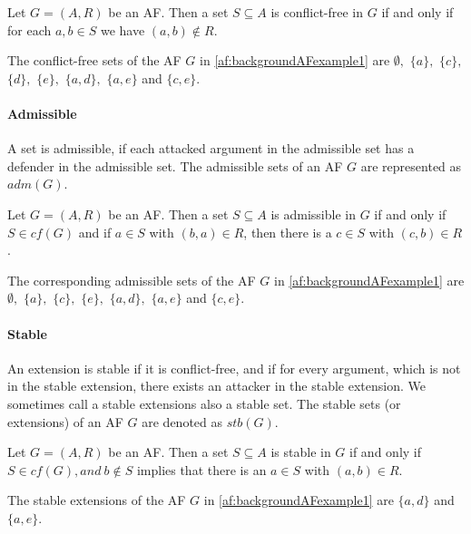 \begin{definition}
    Let $G=(A,R)$ be an AF. Then a set $S \subseteq A$ is conflict-free in $G$ if and only if for each $a, b \in S$ we have $(a, b) \not\in R$.
\end{definition}

\begin{example}
    The conflict-free sets of the AF $G$ in \cref{af:backgroundAFexample1} are $\emptyset ,$
    $\{a\},$
    $\{c\},$
    $\{d\},$
    $\{e\},$
    $\{a, d\},$
    $\{a, e\}$ and
    $\{c, e\}$.
\end{example}





\paragraph{Admissible}  A set is admissible, if each attacked argument in the admissible set has a defender in the admissible set. The admissible sets of an AF $G$ are represented as $adm(G)$.


\begin{definition}
    Let $G=(A,R)$ be an AF. Then a set $S \subseteq A$ is admissible in $G$ if and only if $S \in cf(G)$ and if $a \in S$ with $(b, a) \in R$, then there is a $c \in S$ with $(c, b) \in R$.
\end{definition}
\begin{example}
        The corresponding admissible sets of the AF $G$ in \cref{af:backgroundAFexample1} are $\emptyset ,$
        $\{a\},$
        $\{c\},$
        $\{e\},$
        $\{a, d\},$
        $\{a, e\}$ and
        $\{c, e\}$.
\end{example}



\paragraph{Stable}  An extension is stable if it is conflict-free, and if for every argument, which is not in the stable extension, there exists an attacker in the stable extension. We sometimes call a stable extensions also a stable set. The stable sets (or extensions) of an AF $G$ are denoted as $stb(G)$.


\begin{definition}
    Let $G=(A,R)$ be an AF. Then a set  $S \subseteq A$ is stable in $G$ if and only if $S \in cf(G), and\ b \not\in S$ implies that there is an $a \in S$ with $(a, b) \in R$.
\end{definition}
\begin{example}
        The stable extensions of the AF $G$ in \cref{af:backgroundAFexample1} are
        $\{a, d\}$ and
        $\{a, e\}$.
\end{example}


